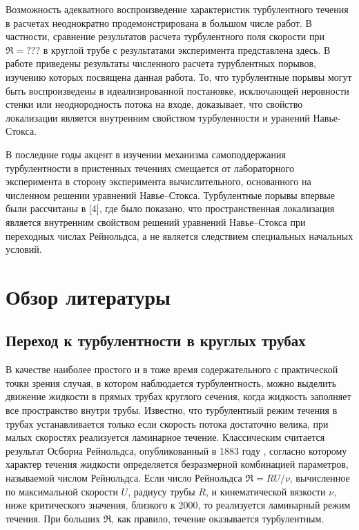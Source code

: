 Возможность адекватного воспроизведение характеристик турбулентного течения в расчетах неоднократно продемонстрирована в большом числе работ. В частности, сравнение результатов расчета турбулентного поля скорости при $\Re = ???$ в круглой трубе с результатами эксперимента представлена здесь. В работе приведены результаты численного расчета турублентных порывов, изучению которых посвящена данная работа. То, что турбулентные порывы могут быть воспроизведены в идеализированной постановке, исключающей неровности стенки или неоднородность потока на входе, доказывает, что свойство локализации является внутренним свойством турбуленности и уранений  Навье-Стокса. 


В последние годы акцент в изучении механизма самоподдержания турбулентности в пристенных течениях смещается от лабораторного эксперимента в сторону эксперимента вычислительного, основанного на численном решении уравнений Навье--Стокса. Турбулентные порывы впервые были рассчитаны в [4], где было показано, что пространственная локализация является внутренним свойством решений уравнений Навье--Стокса при переходных числах Рейнольдса, а не является следствием специальных начальных условий. 

\section{Обзор литературы}

	\subsection{Переход к турбулентности в круглых трубах}

В качестве наиболее простого и в тоже время содержательного с практической точки зрения случая, в котором наблюдается турбулентность, можно выделить движение жидкости в прямых трубах круглого сечения, когда жидкость заполняет все пространство внутри трубы. Известно, что турбулентный режим течения в трубах устанавливается только если скорость потока достаточно велика, при малых скоростях реализуется ламинарное течение. Классическим считается результат Осборна Рейнольдса, опубликованный в 1883 году \cite{Reynolds1883}, согласно которому характер течения жидкости определяется безразмерной комбинацией параметров, называемой числом Рейнольдса. Если число Рейнольдса $\Re = RU/\nu$, вычисленное по максимальной скорости $U$, радиусу трубы $R$, и кинематической вязкости $\nu$, ниже критического значения, близкого к $2000$, то реализуется ламинарный режим течения. При больших $\Re$, как правило, течение оказывается турбулентным. 

